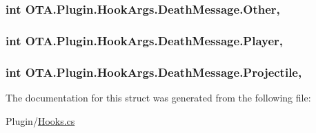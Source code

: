 \subsubsection[{Other}]{\setlength{\rightskip}{0pt plus 5cm}int O\+T\+A.\+Plugin.\+Hook\+Args.\+Death\+Message.\+Other\hspace{0.3cm}{\ttfamily [get]}, {\ttfamily [set]}}\label{struct_o_t_a_1_1_plugin_1_1_hook_args_1_1_death_message_a782ad051e52e79a92cc8a1d0f1e71376}
\hypertarget{struct_o_t_a_1_1_plugin_1_1_hook_args_1_1_death_message_a32f8fbd02342ca7b7d8094b8998432ff}{}
\subsubsection[{Player}]{\setlength{\rightskip}{0pt plus 5cm}int O\+T\+A.\+Plugin.\+Hook\+Args.\+Death\+Message.\+Player\hspace{0.3cm}{\ttfamily [get]}, {\ttfamily [set]}}\label{struct_o_t_a_1_1_plugin_1_1_hook_args_1_1_death_message_a32f8fbd02342ca7b7d8094b8998432ff}
\hypertarget{struct_o_t_a_1_1_plugin_1_1_hook_args_1_1_death_message_adc36b0cf70a60089a9110998d035a2ad}{}
\subsubsection[{Projectile}]{\setlength{\rightskip}{0pt plus 5cm}int O\+T\+A.\+Plugin.\+Hook\+Args.\+Death\+Message.\+Projectile\hspace{0.3cm}{\ttfamily [get]}, {\ttfamily [set]}}\label{struct_o_t_a_1_1_plugin_1_1_hook_args_1_1_death_message_adc36b0cf70a60089a9110998d035a2ad}


The documentation for this struct was generated from the following file\+:\begin{DoxyCompactItemize}
\item 
Plugin/\hyperlink{_hooks_8cs}{Hooks.\+cs}\end{DoxyCompactItemize}
